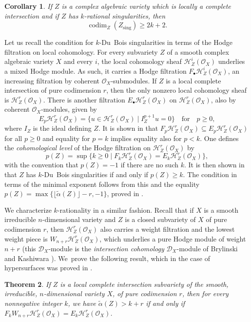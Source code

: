 \documentclass[JEP,XML,SOM,Unicode]{cedram}
\newcommand{\sbullet}{{\scriptscriptstyle\bullet}}
\newcommand{\DXmodule}{$\cD_X$\nobreakdash-mod\-ule\xspace}
\theoremstyle{plain}
\newtheorem{thm}{Theorem}[section]
\newtheorem{cor}[thm]{Corollary}
\theoremstyle{definition}
\newcommand\cD{\mathcal{D}}
\newcommand\cH{\mathcal{H}}
\newcommand\cO{\mathcal{O}}
\newcommand\cH{\mathcal{H}}
\newcommand\cO{\mathcal{O}}
\newcommand\sing{\mathrm{sing}}
\DeclareMathOperator{\codim}{codim}
\begin{document}
\begin{cor}\label{cor2.5_intro}
If $Z$ is a complex algebraic variety which is locally a complete intersection and if $Z$ has $k$-rational singularities, then
\[\codim_Z(Z_\sing)\geq 2k+2.\]
\end{cor}

Let us recall the condition for $k$-Du~Bois singularities in terms of the Hodge filtration on local cohomology. For every subvariety $Z$
of a smooth complex algebraic variety $X$ and every $i$, the local cohomology sheaf $\cH^i_Z(\cO_X)$ underlies a mixed Hodge module. As such, it carries a
Hodge filtration $F_{\sbullet}\cH^i_Z(\cO_X)$, an increasing filtration by coherent $\cO_X$-submodules. If $Z$ is a local complete intersection of pure codimension $r$,
then the only nonzero local cohomology sheaf is $\cH^r_Z(\cO_X)$. There is another filtration $E_{\sbullet}\cH^r_Z(\cO_X)$ on $\cH^r_Z(\cO_X)$,
also by coherent $\cO_X$-modules,
given by
\[E_p\cH^r_Z(\cO_X)=\big\{u\in \cH^r_Z(\cO_X)\mid I_Z^{p+1}u=0\big\}\quad\text{for}\quad p\geq 0,\]
where $I_Z$ is the ideal defining $Z$. It is shown in \cite{MP1} that $F_p\cH^r_Z(\cO_X)\subseteq E_p\cH^r_Z(\cO_X)$ for all $p\geq 0$
and equality for $p=k$ implies equality also for $p<k$.
One defines the \emph{cohomological level} of the Hodge filtration on $\cH^r_Z(\cO_X)$ by
\[p(Z)=\sup\big\{k\geq 0\mid F_k\cH^r_Z(\cO_X)=E_k\cH^r_Z(\cO_X)\big\},\]
with the convention that $p(Z)=-1$ if there are no such $k$. It is then shown in \cite{MP1} that $Z$ has $k$-Du~Bois singularities
if and only if $p(Z)\geq k$. The condition in terms of the minimal exponent follows from this and the equality
$p(Z)=\max\big\{\lfloor\widetilde{\alpha}(Z)\rfloor-r, -1\big\}$, proved in \cite{CDMO}.

We characterize $k$-rationality in a similar fashion. Recall that if $X$ is a smooth irreducible $n$-dimensional variety and $Z$ is a closed subvariety of $X$ of pure codimension $r$, then $\cH^r_Z(\cO_X)$ also carries a weight filtration and the lowest weight piece is $W_{n+r}\cH^r_Z(\cO_X)$, which underlies a pure
Hodge module of weight $n+r$ (this \DXmodule is the \emph{intersection cohomology} \DXmodule of Brylinski and Kashiwara \cite{BK}).
We~prove the following result,
which in the case of hypersurfaces was proved in \cite{Olano}.

\begin{thm}\label{thm2_intro}
If $Z$ is a local complete intersection subvariety of the smooth, irreducible, $n$-dimensional variety $X$, of pure codimension $r$, then for every nonnegative integer
$k$, we have $\widetilde{\alpha}(Z)>k+r$ if and only if
$F_kW_{n+r}\cH^r_Z(\cO_X)=E_k\cH^r_Z(\cO_X)$.
\end{thm}
\end{document}
